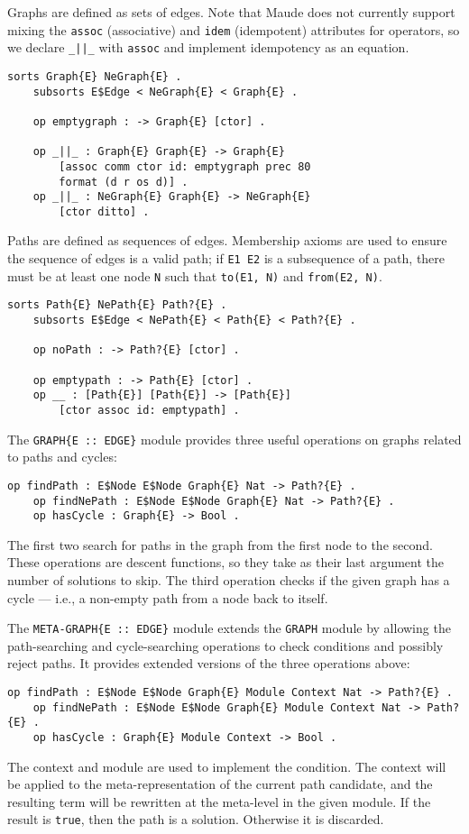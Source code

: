 \documentclass[11pt]{article}
\begin{document}
Graphs are defined as sets of edges. Note that Maude does not currently support
mixing the \lstinline|assoc| (associative) and \lstinline|idem| (idempotent)
attributes for operators, so we declare \lstinline!_||_! with \lstinline|assoc|
and implement idempotency as an equation.
\begin{lstlisting}[language=Maude, style=smalllisting]
    sorts Graph{E} NeGraph{E} .
    subsorts E$Edge < NeGraph{E} < Graph{E} .

    op emptygraph : -> Graph{E} [ctor] .

    op _||_ : Graph{E} Graph{E} -> Graph{E}
        [assoc comm ctor id: emptygraph prec 80
        format (d r os d)] .
    op _||_ : NeGraph{E} Graph{E} -> NeGraph{E}
        [ctor ditto] .
\end{lstlisting}

Paths are defined as sequences of edges. Membership axioms are used to ensure
the sequence of edges is a valid path; if \lstinline|E1 E2| is a subsequence of
a path, there must be at least one node \lstinline|N| such that
\lstinline|to(E1, N)| and \lstinline|from(E2, N)|.
\begin{lstlisting}[language=Maude, style=smalllisting]
    sorts Path{E} NePath{E} Path?{E} .
    subsorts E$Edge < NePath{E} < Path{E} < Path?{E} .

    op noPath : -> Path?{E} [ctor] .

    op emptypath : -> Path{E} [ctor] .
    op __ : [Path{E}] [Path{E}] -> [Path{E}]
        [ctor assoc id: emptypath] .
\end{lstlisting}

The \lstinline|GRAPH{E :: EDGE}| module provides three useful operations on
graphs related to paths and cycles:
\begin{lstlisting}[language=Maude, style=smalllisting]
    op findPath : E$Node E$Node Graph{E} Nat -> Path?{E} .
    op findNePath : E$Node E$Node Graph{E} Nat -> Path?{E} .
    op hasCycle : Graph{E} -> Bool .
\end{lstlisting}
The first two search for paths in the graph from the first node to the second.
These operations are descent functions, so they take as their last argument the
number of solutions to skip. The third operation checks if the given graph has
a cycle --- i.e., a non-empty path from a node back to itself.

The \lstinline|META-GRAPH{E :: EDGE}| module extends the \lstinline|GRAPH|
module by allowing the path-searching and cycle-searching operations to check
conditions and possibly reject paths. It provides extended versions of the
three operations above:
\begin{lstlisting}[language=Maude, style=smalllisting]
    op findPath : E$Node E$Node Graph{E} Module Context Nat -> Path?{E} .
    op findNePath : E$Node E$Node Graph{E} Module Context Nat -> Path?{E} .
    op hasCycle : Graph{E} Module Context -> Bool .
\end{lstlisting}
The context and module are used to implement the condition. The context will be
applied to the meta-representation of the current path candidate, and the
resulting term will be rewritten at the meta-level in the given module. If the
result is \lstinline|true|, then the path is a solution. Otherwise it is
discarded.
\end{document}
